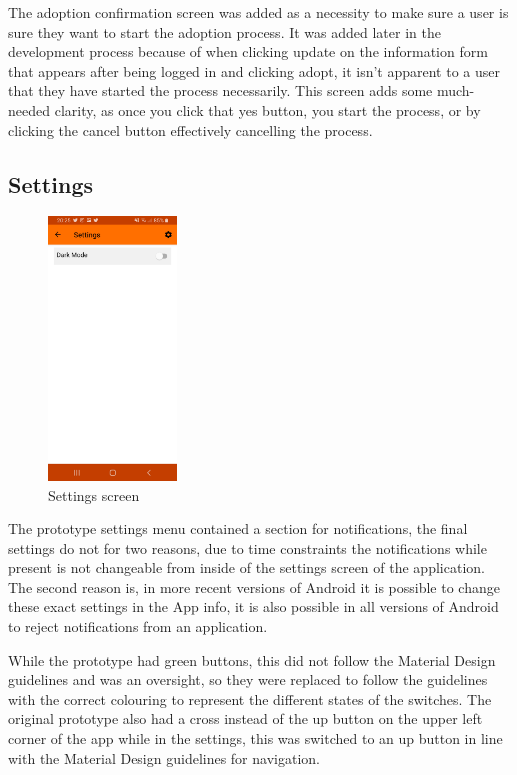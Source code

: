 The adoption confirmation screen was added as a necessity to make sure a user is sure they want to start the adoption process. It was added later in the development process because of when clicking update on the information form that appears after being logged in and clicking adopt, it isn't apparent to a user that they have started the process necessarily. This screen adds some much-needed clarity, as once you click that yes button, you start the process, or by clicking the cancel button effectively cancelling the process.

\subsection{Settings}

\begin{figure} [htbp!]
    \centering
    \includegraphics[height=7cm]{Images/SettingsScreen.jpg}
    \caption{Settings screen}
    \label{fig:settings_screen}
\end{figure}

The prototype settings menu contained a section for notifications, the final settings do not for two reasons, due to time constraints the notifications while present is not changeable from inside of the settings screen of the application. The second reason is, in more recent versions of Android it is possible to change these exact settings in the App info, it is also possible in all versions of Android to reject notifications from an application. 

While the prototype had green buttons, this did not follow the Material Design guidelines and was an oversight, so they were replaced to follow the guidelines with the correct colouring to represent the different states of the switches. The original prototype also had a cross instead of the up button on the upper left corner of the app while in the settings, this was switched to an up button in line with the Material Design guidelines for navigation.

